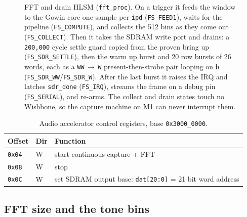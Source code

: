 \documentclass[a4paper,11pt]{article}
\begin{document}
\begin{figure}[H]
{%
}
\caption{FFT and drain HLSM (\texttt{fft\_proc}). On a trigger it feeds the window
to the Gowin core one sample per \texttt{ipd} (\texttt{FS\_FEED1}), waits for the
pipeline (\texttt{FS\_COMPUTE}), and collects the 512 bins as they come out
(\texttt{FS\_COLLECT}). Then it takes the SDRAM write port and drains: a
\texttt{200{,}000} cycle settle guard copied from the proven bring up
(\texttt{FS\_SDR\_SETTLE}), then the warm up burst and 20 row bursts of 26 words,
each as a \texttt{WW}\,$\to$\,\texttt{W} present-then-strobe pair looping on
\texttt{b} (\texttt{FS\_SDR\_WW}/\texttt{FS\_SDR\_W}). After the last burst it
raises the IRQ and latches \texttt{sdr\_done} (\texttt{FS\_IRQ}), streams the frame
on a debug pin (\texttt{FS\_SERIAL}), and re-arms. The collect and drain states
touch no Wishbone, so the capture machine on M1 can never interrupt them.}
\label{fig:fft-hlsm}
\end{figure}

\begin{table}[H]
\centering
\caption{Audio accelerator control registers, base \texttt{0x3000\_0000}.}
\begin{tabular}{lll}
\toprule
\textbf{Offset} & \textbf{Dir} & \textbf{Function} \\
\midrule
\texttt{0x04} & W & start continuous capture + FFT \\
\texttt{0x08} & W & stop \\
\texttt{0x0C} & W & set SDRAM output base: \texttt{dat[20:0]} = 21 bit word address \\
\bottomrule
\end{tabular}
\end{table}

\subsection{FFT size and the tone bins}
\end{document}
